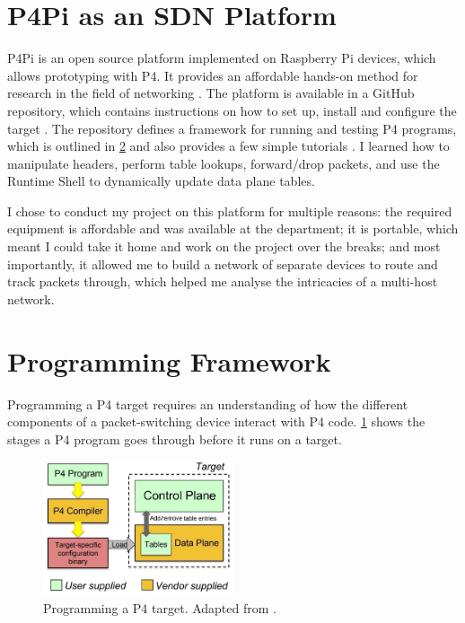 \section{P4Pi as an SDN Platform}
\label{sec:2.3}
P4Pi is an open source platform implemented on Raspberry Pi devices, which allows prototyping with P4. It provides an affordable hands-on method for research in the field of networking \cite{P4Pi}. The platform is available in a GitHub repository, which contains instructions on how to set up, install and configure the target \cite{P4Pi}. The repository defines a framework for running and testing P4 programs, which is outlined in \cref{sec:2.4} and also provides a few simple tutorials \cite{P4Pi}. I learned how to manipulate headers, perform table lookups, forward/drop packets, and use the Runtime Shell to dynamically update data plane tables.

I chose to conduct my project on this platform for multiple reasons: the required equipment is affordable and was available at the department; it is portable, which meant I could take it home and work on the project over the breaks; and most importantly, it allowed me to build a network of separate devices to route and track packets through, which helped me analyse the intricacies of a multi-host network. 



\section{Programming Framework}
\label{sec:2.4}

Programming a P4 target requires an understanding of how the different components of a packet-switching device interact with P4 code. \cref{fig:prep-framework} shows the stages a P4 program goes through before it runs on a target.

\begin{figure}[htbp]
  \centering
    \includegraphics[width=0.5\textwidth]{figures/preparation/programming_target.jpg}
     \caption{Programming a P4 target. Adapted from \cite{P4LangTutorial}.}
     \label{fig:prep-framework}
\end{figure}

